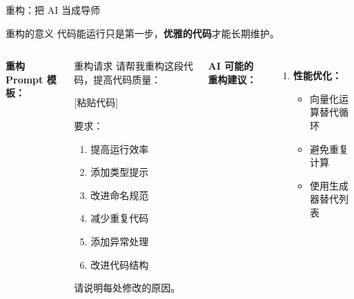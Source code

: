
\begin{frame}{重构：把 AI 当成导师}
	\begin{block}{重构的意义}
		代码能运行只是第一步，\textbf{优雅的代码}才能长期维护。
	\end{block}

	\vspace{0.3cm}

	\begin{columns}
		\textbf{重构 Prompt 模板：}

		\vspace{0.2cm}

		\begin{exampleblock}{重构请求}
			请帮我重构这段代码，提高代码质量：

			\vspace{0.2cm}

			[粘贴代码]

			\vspace{0.2cm}

			要求：
			\begin{enumerate}
				\item 提高运行效率
				\item 添加类型提示
				\item 改进命名规范
				\item 减少重复代码
				\item 添加异常处理
				\item 改进代码结构
			\end{enumerate}

			请说明每处修改的原因。
		\end{exampleblock}

		\textbf{AI 可能的重构建议：}

		\vspace{0.2cm}

		\begin{enumerate}
			\item \textbf{性能优化：}
			      \begin{itemize}
				      \item 向量化运算替代循环
				      \item 避免重复计算
				      \item 使用生成器替代列表
			      \end{itemize}


\end{enumerate}
\end{columns}
\end{frame}
